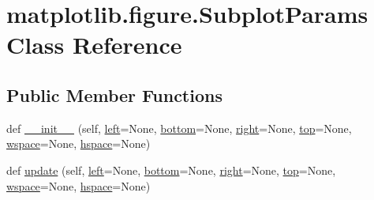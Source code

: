 \hypertarget{classmatplotlib_1_1figure_1_1SubplotParams}{}\section{matplotlib.\+figure.\+Subplot\+Params Class Reference}
\label{classmatplotlib_1_1figure_1_1SubplotParams}
\subsection*{Public Member Functions}
\begin{DoxyCompactItemize}
\item 
def \hyperlink{classmatplotlib_1_1figure_1_1SubplotParams_ad197131d70e8c8deeea4619f551a392a}{\+\_\+\+\_\+init\+\_\+\+\_\+} (self, \hyperlink{classmatplotlib_1_1figure_1_1SubplotParams_aeb896b8ae56f68aada9338f394e80693}{left}=None, \hyperlink{classmatplotlib_1_1figure_1_1SubplotParams_a8f8adf624143b057e6ab108e3e1cac17}{bottom}=None, \hyperlink{classmatplotlib_1_1figure_1_1SubplotParams_af8c3bd90d87372678adcedfc3538d0a2}{right}=None, \hyperlink{classmatplotlib_1_1figure_1_1SubplotParams_a1b64e11c2d7e445073c52b3c508de2ca}{top}=None, \hyperlink{classmatplotlib_1_1figure_1_1SubplotParams_a2ccba74a52f1e7a9160a8d331d95c30b}{wspace}=None, \hyperlink{classmatplotlib_1_1figure_1_1SubplotParams_a110507b89d5bc6d1d04ab28a6be122d9}{hspace}=None)
\item 
def \hyperlink{classmatplotlib_1_1figure_1_1SubplotParams_a5a0bdf15e19379636953494c90a81030}{update} (self, \hyperlink{classmatplotlib_1_1figure_1_1SubplotParams_aeb896b8ae56f68aada9338f394e80693}{left}=None, \hyperlink{classmatplotlib_1_1figure_1_1SubplotParams_a8f8adf624143b057e6ab108e3e1cac17}{bottom}=None, \hyperlink{classmatplotlib_1_1figure_1_1SubplotParams_af8c3bd90d87372678adcedfc3538d0a2}{right}=None, \hyperlink{classmatplotlib_1_1figure_1_1SubplotParams_a1b64e11c2d7e445073c52b3c508de2ca}{top}=None, \hyperlink{classmatplotlib_1_1figure_1_1SubplotParams_a2ccba74a52f1e7a9160a8d331d95c30b}{wspace}=None, \hyperlink{classmatplotlib_1_1figure_1_1SubplotParams_a110507b89d5bc6d1d04ab28a6be122d9}{hspace}=None)
\end{DoxyCompactItemize}

